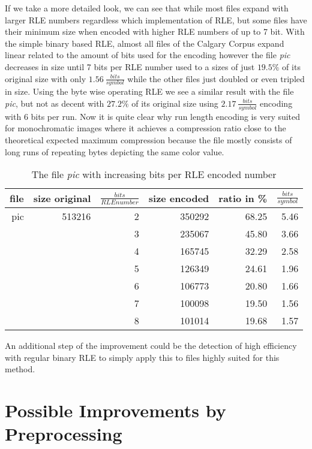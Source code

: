 \par{
If we take a more detailed look, we can see that while most files expand with larger RLE numbers regardless which implementation of RLE, but some files have their minimum size when encoded with higher RLE numbers of up to 7 bit. With the simple binary based RLE, almost all files of the Calgary Corpus expand linear related to the amount of bits used for the encoding however the file \textit{pic} decreases in size until 7 bits per RLE number used to a sizes of just $19.5 \%$ of its original size with only  $1.56 \: \frac{bits}{symbol}$ while the other files just doubled or even tripled in size. Using the byte wise operating RLE we see a similar result with the file \textit{pic}, but not as decent with $27.2\%$ of its original size using $2.17 \: \frac{bits}{symbol}$ encoding with 6 bits per run. Now it is quite clear why run length encoding is very suited for monochromatic images where it achieves a compression ratio close to the theoretical expected maximum compression because the file mostly consists of long runs of repeating bytes depicting the same color value.

\begin{table}[H]
	\centering
	\begin{tabular}{r|r|r|r|r|r}	
		file & size original & $\frac{bits}{RLE number}$ & size encoded & ratio in \% & $\frac{bits}{symbol}$\\
		\hline
		pic & 513216 & 2 & 350292 & 68.25 & 5.46 \\
		 & & 3 & 235067 & 45.80 & 3.66\\
		 & & 4 & 165745 & 32.29 & 2.58\\
		 & & 5 & 126349 & 24.61 & 1.96\\
		 & & 6 & 106773 & 20.80 & 1.66\\
		 & & 7 & 100098 & 19.50 & 1.56\\
		 & & 8 & 101014 & 19.68 & 1.57\\		 
	\end{tabular}
	\caption{The file \textit{pic} with increasing bits per RLE encoded number}
	\label{tab:t40 The file pic with increasing bits per RLE encoded number}
\end{table}	
}

\par{
An additional step of the improvement could be the detection of high efficiency with regular binary RLE to simply apply this to files highly suited for this method.
}

\section{Possible Improvements by Preprocessing}
\label{ch:Analysis:sec:Improvements by Preprocessing}

